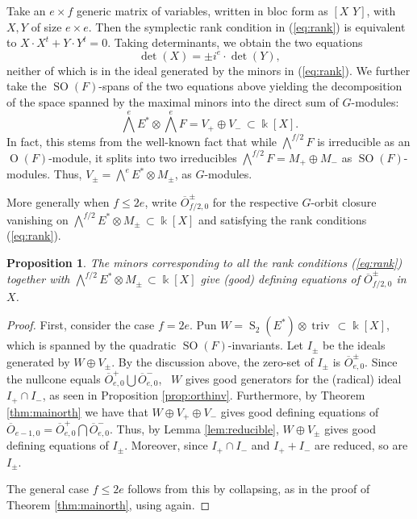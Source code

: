 \documentclass[11pt]{amsart}
\numberwithin{equation}{section}
\newtheorem{proposition}[equation]{Proposition}
\theoremstyle{definition}
\DeclareMathOperator{\SO}{SO}
\newcommand{\op}{\operatorname}
\newcommand{\oo}{\otimes}
\newcommand{\ol}{\overline}
\newcommand{\kk}{\Bbbk}
\begin{document}
Take an $e\times f$ generic matrix of variables, written in bloc form as $[X \,\, Y]$, with $X, Y$ of size $e \times e$. Then the symplectic rank condition in (\ref{eq:rank}) is equivalent to $X\cdot X^t + Y\cdot Y^t = 0$. Taking determinants, we obtain the two equations
\[\det(X) =\pm i^e \cdot \det(Y),\]
neither of which is in the ideal generated by the minors in (\ref{eq:rank}). We further take the $\SO(F)$-spans of the two equations above yielding the decomposition of the space spanned by the maximal minors into the direct sum of $G$-modules:
\[\bigwedge^e E^* \oo \bigwedge^e F= V_+ \oplus V_- \, \subset \kk[X].\]
In fact, this stems from the well-known fact that while $\bigwedge^{f/2} F$ is irreducible as an $\op{O}(F)$-module, it splits into two irreducibles $\bigwedge^{f/2} F=M_+ \oplus M_-$ as $\SO(F)$-modules. Thus, $V_\pm = \bigwedge^e E^*  \oo M_\pm$, as $G$-modules. 

More generally when $f\leq 2e$, write $\ol{O}_{f/2, 0}^{\pm}$ for the respective $G$-orbit closure vanishing on $\bigwedge^{f/2} E^* \oo M_\pm \, \subset \kk[X]$ and satisfying the rank conditions (\ref{eq:rank}).

\begin{proposition}\label{prop:eqred}
The minors corresponding to all the rank conditions (\ref{eq:rank}) together with $\bigwedge^{f/2} E^* \oo M_\pm \, \subset \kk[X]$ give (good) defining equations of $\ol{O}_{f/2, 0}^{\pm}$ in $X$.
\end{proposition}

\begin{proof}
First, consider the case $f=2e$. Pun $W=\op{S}_2(E^*) \oo \op{triv} \, \subset \kk[X]$, which is spanned by the quadratic $\SO(F)$-invariants. Let $I_\pm$ be the ideals generated by $W \oplus V_\pm$. By the discussion above, the zero-set of $I_\pm$ is $\ol{O}_{e, 0}^{\pm}$. Since the nullcone equals $\ol{O}_{e, 0}^+\bigcup \ol{O}_{e, 0}^{-}$, \, $W$ gives good generators for the (radical) ideal $I_+\cap I_-$, as seen in Proposition \ref{prop:orthinv}. Furthermore, by Theorem \ref{thm:mainorth} we have that $W\oplus V_+ \oplus V_-$ gives good defining equations of $\ol{O}_{e-1,0} = \ol{O}_{e, 0}^+\bigcap \ol{O}_{e, 0}^{-}$. Thus, by Lemma \ref{lem:reducible}, $W\oplus V_\pm$ gives good defining equations of $I_\pm$. Moreover, since $I_+\cap I_-$ and $I_+ + I_-$ are reduced, so are $I_\pm$.

The general case $f\leq 2e$ follows from this by collapsing, as in the proof of Theorem \ref{thm:mainorth}, using \cite[Thoerem 1.5]{me} again.
\end{proof}
\end{document}

